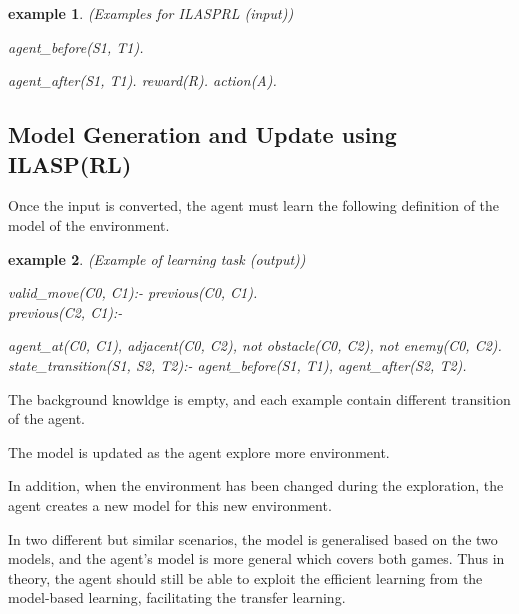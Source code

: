 \documentclass[12pt,twoside]{report}
\newtheorem{examp}{example}[section]
\begin{document}
\begin{examp} (Examples for ILASPRL (input))

agent\_before(S1, T1).

agent\_after(S1, T1).
reward(R).
action(A).

\end{examp}
\label{ilasprl_input}

\subsection{Model Generation and Update using ILASP(RL)}

Once the input is converted, the agent must learn the following definition of the model of the environment.

\begin{examp} (Example of learning task (output))

valid\_move(C0, C1):- previous(C0, C1).
\\
previous(C2, C1):-

agent\_at(C0, C1),
adjacent(C0, C2),
not obstacle(C0, C2),
not enemy(C0, C2).
\\
state\_transition(S1, S2, T2):-
  agent\_before(S1, T1),
  agent\_after(S2, T2).

\end{examp}
\label{learning_task}

The background knowldge is empty, and each example contain different transition of the agent.

The model is updated as the agent explore more environment.


In addition, when the environment has been changed during the exploration, the agent creates a new model for this new environment.


In two different but similar scenarios, the model is generalised based on the two models, and the agent's model is more general which covers both games. Thus in theory, the agent should still be able to exploit the efficient learning from the model-based learning, facilitating the transfer learning.
\end{document}
